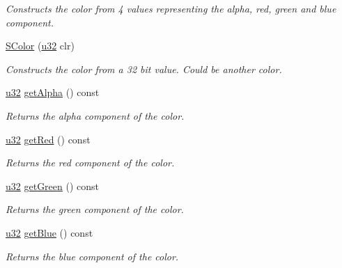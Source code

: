 \begin{DoxyCompactItemize}
\begin{DoxyCompactList}\small\item\em Constructs the color from 4 values representing the alpha, red, green and blue component. \end{DoxyCompactList}\item 
\mbox{\label{classirr_1_1video_1_1SColor_a56dd5677c3e36d3b33d5d796be2597da}} 
\hyperlink{classirr_1_1video_1_1SColor_a56dd5677c3e36d3b33d5d796be2597da}{S\+Color} (\hyperlink{namespaceirr_a0416a53257075833e7002efd0a18e804}{u32} clr)
\begin{DoxyCompactList}\small\item\em Constructs the color from a 32 bit value. Could be another color. \end{DoxyCompactList}\item 
\hyperlink{namespaceirr_a0416a53257075833e7002efd0a18e804}{u32} \hyperlink{classirr_1_1video_1_1SColor_a8b0bcff9036b06e3483978a84a924b91}{get\+Alpha} () const
\begin{DoxyCompactList}\small\item\em Returns the alpha component of the color. \end{DoxyCompactList}\item 
\hyperlink{namespaceirr_a0416a53257075833e7002efd0a18e804}{u32} \hyperlink{classirr_1_1video_1_1SColor_a70d11ec2247581c79ee11e0e1b511978}{get\+Red} () const
\begin{DoxyCompactList}\small\item\em Returns the red component of the color. \end{DoxyCompactList}\item 
\hyperlink{namespaceirr_a0416a53257075833e7002efd0a18e804}{u32} \hyperlink{classirr_1_1video_1_1SColor_a198773366f2a5436c1ca4adc9037bb8d}{get\+Green} () const
\begin{DoxyCompactList}\small\item\em Returns the green component of the color. \end{DoxyCompactList}\item 
\hyperlink{namespaceirr_a0416a53257075833e7002efd0a18e804}{u32} \hyperlink{classirr_1_1video_1_1SColor_afb60ac456b2efc2f2a4f04a643293d26}{get\+Blue} () const
\begin{DoxyCompactList}\small\item\em Returns the blue component of the color. \end{DoxyCompactList}\item 

\end{DoxyCompactItemize}
